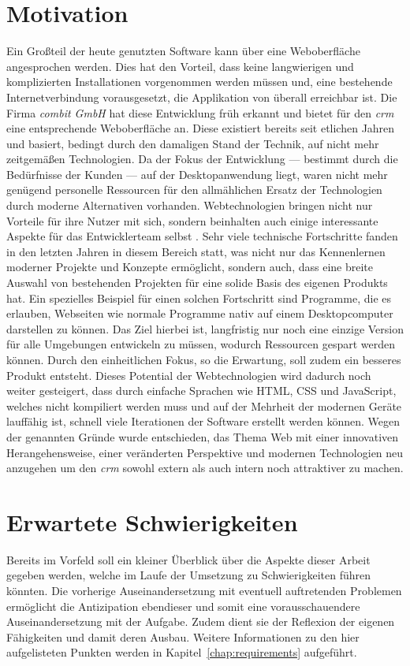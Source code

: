 \section{Motivation}
Ein Großteil der heute genutzten Software kann über eine Weboberfläche angesprochen werden. Dies hat den Vorteil, dass keine langwierigen und komplizierten Installationen vorgenommen werden müssen und, eine bestehende Internetverbindung vorausgesetzt, die Applikation von überall erreichbar ist. Die Firma \textit{combit GmbH} hat diese Entwicklung früh erkannt und bietet für den \textit{\gls{crm}} eine entsprechende Weboberfläche an. Diese existiert bereits seit etlichen Jahren und basiert, bedingt durch den damaligen Stand der Technik, auf nicht mehr zeitgemäßen Technologien. Da der Fokus der Entwicklung --- bestimmt durch die Bedürfnisse der Kunden --- auf der Desktopanwendung liegt, waren nicht mehr genügend personelle Ressourcen für den allmählichen Ersatz der Technologien durch moderne Alternativen vorhanden.
Webtechnologien bringen nicht nur Vorteile für ihre Nutzer mit sich, sondern beinhalten auch einige interessante Aspekte für das Entwicklerteam selbst . Sehr viele technische Fortschritte fanden in den letzten Jahren in diesem Bereich statt, was nicht nur das Kennenlernen moderner Projekte und Konzepte ermöglicht, sondern auch, dass eine breite Auswahl von bestehenden Projekten für eine solide Basis des eigenen Produkts hat. Ein spezielles Beispiel für einen solchen Fortschritt sind Programme, die es erlauben, Webseiten wie normale Programme nativ auf einem Desktopcomputer darstellen zu können. Das Ziel hierbei ist, langfristig nur noch eine einzige Version für alle Umgebungen entwickeln zu müssen, wodurch Ressourcen gespart werden können. Durch den einheitlichen Fokus, so die Erwartung, soll zudem ein besseres Produkt entsteht. Dieses Potential der Webtechnologien wird dadurch noch weiter gesteigert, dass durch einfache Sprachen wie HTML, CSS und JavaScript, welches nicht kompiliert werden muss und auf der Mehrheit der modernen Geräte lauffähig ist, schnell viele Iterationen der Software erstellt werden können.
Wegen der genannten Gründe wurde entschieden, das Thema Web mit einer innovativen Herangehensweise, einer veränderten Perspektive und modernen Technologien neu anzugehen um den \textit{\gls{crm}} sowohl extern als auch intern noch attraktiver zu machen.

\section{Erwartete Schwierigkeiten}
Bereits im Vorfeld soll ein kleiner Überblick über die Aspekte dieser Arbeit gegeben werden, welche im Laufe der Umsetzung zu Schwierigkeiten führen könnten. Die vorherige Auseinandersetzung mit eventuell auftretenden Problemen ermöglicht die Antizipation ebendieser und somit eine vorausschauendere Auseinandersetzung mit der Aufgabe. Zudem dient sie der Reflexion der eigenen Fähigkeiten und damit deren Ausbau. Weitere Informationen zu den hier aufgelisteten Punkten werden in Kapitel~\ref{chap:requirements} aufgeführt.


